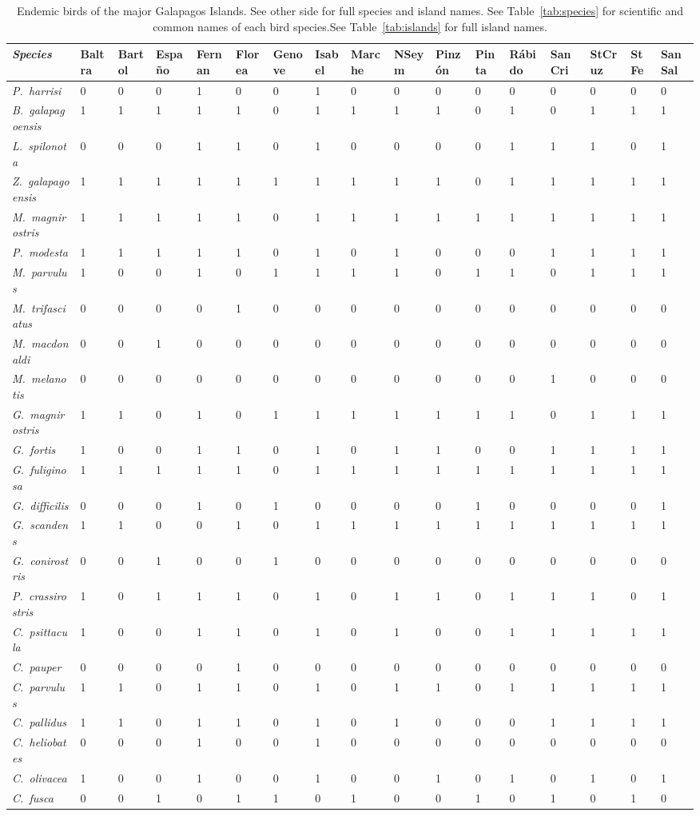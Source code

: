\documentclass[11pt]{article}
\begin{document}
\begin{landscape}


{\fontsize{10pt}{12pt}\selectfont
	
\begin{longtable}[l]{>{\em}lllllllllllllllll}
\caption{Endemic birds of the major Galapagos Islands. See other side for full species and island names. See Table~\ref{tab:species} for scientific and common names of each bird species.\newline  See Table~\ref{tab:islands} for full island names.}\label{tab:endemic}\tabularnewline
\toprule
\textup{Species} & Baltra & Bartol & Españo & Fernan & Florea & Genove & Isabel & Marche & NSeym & Pinzón & Pinta & Rábido & SanCri & StCruz & StFe & SanSal \tabularnewline
\midrule
P.~harrisi & 0 & 0 & 0 & 1 & 0 & 0 & 1 & 0 & 0 & 0 & 0 & 0 & 0 & 0 & 0 & 0\tabularnewline
B.~galapagoensis & 1 & 1 & 1 & 1 & 1 & 0 & 1 & 1 & 1 & 1 & 0 & 1 & 0 & 1 & 1 & 1\tabularnewline
L.~spilonota & 0 & 0 & 0 & 1 & 1 & 0 & 1 & 0 & 0 & 0 & 0 & 1 & 1 & 1 & 0 & 1\tabularnewline
Z.~galapagoensis & 1 & 1 & 1 & 1 & 1 & 1 & 1 & 1 & 1 & 1 & 0 & 1 & 1 & 1 & 1 & 1\tabularnewline
M.~magnirostris & 1 & 1 & 1 & 1 & 1 & 0 & 1 & 1 & 1 & 1 & 1 & 1 & 1 & 1 & 1 & 1\tabularnewline
P.~modesta & 1 & 1 & 1 & 1 & 1 & 0 & 1 & 0 & 1 & 0 & 0 & 0 & 1 & 1 & 1 & 1\tabularnewline
M.~parvulus & 1 & 0 & 0 & 1 & 0 & 1 & 1 & 1 & 1 & 0 & 1 & 1 & 0 & 1 & 1 & 1\tabularnewline
M.~trifasciatus & 0 & 0 & 0 & 0 & 1 & 0 & 0 & 0 & 0 & 0 & 0 & 0 & 0 & 0 & 0 & 0\tabularnewline
M.~macdonaldi & 0 & 0 & 1 & 0 & 0 & 0 & 0 & 0 & 0 & 0 & 0 & 0 & 0 & 0 & 0 & 0\tabularnewline
M.~melanotis & 0 & 0 & 0 & 0 & 0 & 0 & 0 & 0 & 0 & 0 & 0 & 0 & 1 & 0 & 0 & 0\tabularnewline
G.~magnirostris & 1 & 1 & 0 & 1 & 0 & 1 & 1 & 1 & 1 & 1 & 1 & 1 & 0 & 1 & 1 & 1\tabularnewline
G.~fortis & 1 & 0 & 0 & 1 & 1 & 0 & 1 & 0 & 1 & 1 & 0 & 0 & 1 & 1 & 1 & 1\tabularnewline
G.~fuliginosa & 1 & 1 & 1 & 1 & 1 & 0 & 1 & 1 & 1 & 1 & 1 & 1 & 1 & 1 & 1 & 1\tabularnewline
G.~difficilis & 0 & 0 & 0 & 1 & 0 & 1 & 0 & 0 & 0 & 0 & 1 & 0 & 0 & 0 & 0 & 1\tabularnewline
G.~scandens & 1 & 1 & 0 & 0 & 1 & 0 & 1 & 1 & 1 & 1 & 1 & 1 & 1 & 1 & 1 & 1\tabularnewline
G.~conirostris & 0 & 0 & 1 & 0 & 0 & 1 & 0 & 0 & 0 & 0 & 0 & 0 & 0 & 0 & 0 & 0\tabularnewline
P.~crassirostris & 1 & 0 & 1 & 1 & 1 & 0 & 1 & 0 & 1 & 1 & 0 & 1 & 1 & 1 & 0 & 1\tabularnewline
C.~psittacula & 1 & 0 & 0 & 1 & 1 & 0 & 1 & 0 & 1 & 0 & 0 & 1 & 1 & 1 & 1 & 1\tabularnewline
C.~pauper & 0 & 0 & 0 & 0 & 1 & 0 & 0 & 0 & 0 & 0 & 0 & 0 & 0 & 0 & 0 & 0\tabularnewline
C.~parvulus & 1 & 1 & 0 & 1 & 1 & 0 & 1 & 0 & 1 & 1 & 0 & 1 & 1 & 1 & 1 & 1\tabularnewline
C.~pallidus & 1 & 1 & 0 & 1 & 1 & 0 & 1 & 0 & 1 & 0 & 0 & 0 & 1 & 1 & 1 & 1\tabularnewline
C.~heliobates & 0 & 0 & 0 & 1 & 0 & 0 & 1 & 0 & 0 & 0 & 0 & 0 & 0 & 0 & 0 & 0\tabularnewline
C.~olivacea & 1 & 0 & 0 & 1 & 0 & 0 & 1 & 0 & 0 & 1 & 0 & 1 & 0 & 1 & 0 & 1\tabularnewline
C.~fusca & 0 & 0 & 1 & 0 & 1 & 1 & 0 & 1 & 0 & 0 & 1 & 0 & 1 & 0 & 1 & 0\tabularnewline
\bottomrule
\end{longtable}
}

\end{landscape}
\end{document}
